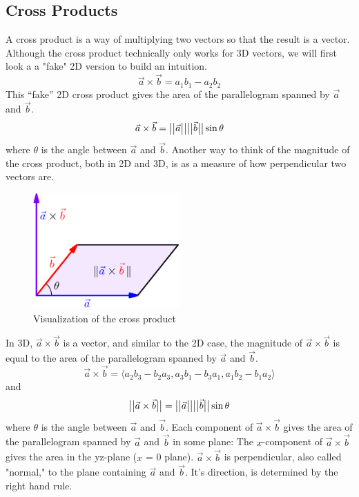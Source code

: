 \subsection{Cross Products}
\noindent
A cross product is a way of multiplying two vectors so that the result is a vector.
Although the cross product technically only works for 3D vectors, we will first look a a "fake" 2D version to build an intuition.
\begin{equation*}
	\vec{a}\times\vec{b} = a_1b_1-a_2b_2
\end{equation*}
This ``fake'' 2D cross product gives the area of the parallelogram spanned by $\vec{a}$ and $\vec{b}$.
\begin{equation*}
	\vec{a}\times\vec{b} = \big\lvert \big\lvert \vec{a} \big\rvert \big\rvert\big\lvert \big\lvert \vec{b} \big\rvert \big\rvert\sin{\theta}	
\end{equation*}
where $\theta$ is the angle between $\vec{a}$ and $\vec{b}$.
Another way to think of the magnitude of the cross product, both in 2D and 3D, is as a measure of how perpendicular two vectors are.

\begin{figure}[H]
	\centering
	\includegraphics[width=0.5\textwidth]{./Images/backgroundReview/CrossProduct.png}
	\caption{Visualization of the cross product}
\end{figure}

\noindent
In 3D, $\vec{a}\times\vec{b}$ is a vector, and similar to the 2D case, the magnitude of $\vec{a}\times\vec{b}$ is equal to the area of the parallelogram spanned by $\vec{a}$ and $\vec{b}$.
\begin{equation*}
	\vec{a}\times\vec{b} = \langle a_2b_3-b_2a_3,a_3b_1-b_3a_1,a_1b_2-b_1a_2 \rangle
\end{equation*}
and
\begin{equation*}
	\big\lvert \big\lvert \vec{a}\times\vec{b} \big\rvert \big\rvert=\big\lvert \big\lvert \vec{a} \big\rvert \big\rvert\big\lvert \big\lvert \vec{b} \big\rvert \big\rvert\sin{\theta}
\end{equation*}
where $\theta$ is the angle between $\vec{a}$ and $\vec{b}$.
Each component of $\vec{a}\times\vec{b}$ gives the area of the parallelogram spanned by $\vec{a}$ and $\vec{b}$ in some plane:
The $x$-component of $\vec{a}\times\vec{b}$ gives the area in the yz-plane ($x$ = 0 plane).
$\vec{a}\times\vec{b}$ is perpendicular, also called "normal," to the plane containing $\vec{a}$ and $\vec{b}$. It's direction, is determined by the right hand rule.\\

